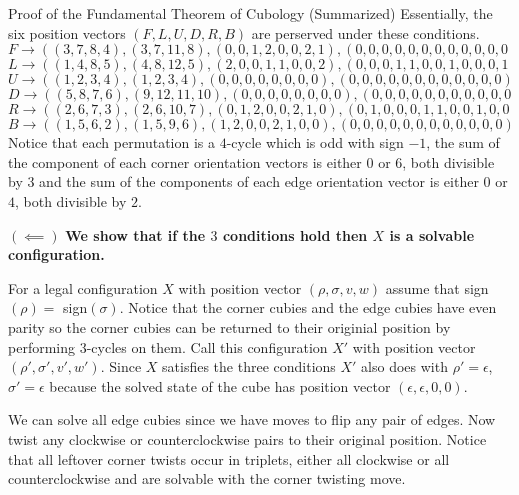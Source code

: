 \documentclass[final]{beamer}
\newlength{\colwidth}
\begin{document}
\begin{frame}[t]
\begin{columns}[t]
\begin{column}{\colwidth}
\begin{block}{Proof of the Fundamental Theorem of Cubology (Summarized)}
Essentially, the six position vectors $(F,L,U,D,R,B)$ are perserved under these conditions.
$$F \rightarrow ((3, 7, 8, 4), (3, 7, 11, 8), (0, 0, 1, 2, 0, 0, 2, 1), (0, 0, 0, 0, 0, 0, 0, 0, 0, 0, 0, 0))$$
$$L \rightarrow ((1 ,4,8,5),(4,8,12,5),(2, 0, 0, 1, 1, 0, 0, 2), (0, 0, 0, 1, 1, 0, 0, 1, 0, 0, 0, 1))$$
$$U \rightarrow ((1, 2, 3, 4), (1, 2, 3, 4), (0, 0, 0, 0, 0, 0, 0, 0), (0, 0, 0, 0, 0, 0, 0, 0, 0, 0, 0, 0))$$
$$D \rightarrow ((5, 8, 7, 6), (9, 12, 11, 10), (0, 0, 0, 0, 0, 0, 0, 0), (0, 0, 0, 0, 0, 0, 0, 0, 0, 0, 0, 0))$$
$$R \rightarrow ((2,6,7,3),(2,6,10,7),(0,1,2,0,0,2,1,0),(0,1,0,0,0,1,1,0,0,1,0,0))$$
$$B \rightarrow ((1, 5, 6, 2), (1, 5, 9, 6), (1, 2, 0, 0, 2, 1, 0, 0), (0, 0, 0, 0, 0, 0, 0, 0, 0, 0, 0, 0))$$
Notice that each permutation is a $4$-cycle which is odd with sign $-1$, the sum of the component of each corner orientation vectors is either $0$ or $6$, both divisible by $3$ and
the sum of the components of each edge orientation vector is either $0$ or $4$, both divisible by $2$.

$(\impliedby)$
\textbf{We show that if the $3$ conditions hold then $X$ is a solvable configuration.}

For a legal configuration $X$ with position vector $(\rho, \sigma, v, w)$ assume that sign$(\rho)=$ sign$(\sigma)$.
Notice that the corner cubies and the edge cubies have even parity so the corner cubies can be returned to their originial position by performing $3$-cycles on them.
Call this configuration $X'$ with position vector $(\rho', \sigma', v', w')$.
Since $X$ satisfies the three conditions $X'$ also does with $\rho' = \epsilon$, $\sigma' = \epsilon$ because the solved state of the cube has position vector $(\epsilon, \epsilon, 0 , 0)$.

We can solve all edge cubies since we have moves to flip any pair of edges.
Now twist any clockwise or counterclockwise pairs to their original position.
Notice that all leftover corner twists occur in triplets, either all clockwise or all counterclockwise and are solvable with the corner twisting move.


  \end{block}



\end{column}
\end{columns}
\end{frame}
\end{document}
